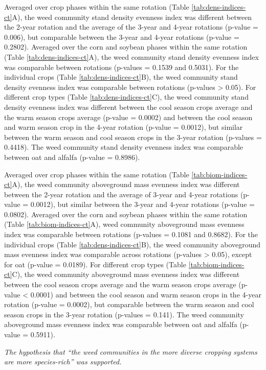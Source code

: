 \documentclass[
]{article}
\begin{document}
Averaged over crop phases within the same rotation (Table \ref{tab:dens-indices-ct}A), the weed community stand density evenness index was different between the 2-year rotation and the average of the 3-year and 4-year rotations (p-value = 0.006), but comparable between the 3-year and 4-year rotations (p-value = 0.2802). Averaged over the corn and soybean phases within the same rotation (Table \ref{tab:dens-indices-ct}A), the weed community stand density evenness index was comparable between rotations (p-values = 0.1539 and 0.5031). For the individual crops (Table \ref{tab:dens-indices-ct}B), the weed community stand density evenness index was comparable between rotations (p-values \textgreater{} 0.05). For different crop types (Table \ref{tab:dens-indices-ct}C), the weed community stand density evenness index was different between the cool season crops average and the warm season crops average (p-value = 0.0002) and between the cool season and warm season crop in the 4-year rotation (p-value = 0.0012), but similar between the warm season and cool season crops in the 3-year rotation (p-values = 0.4418). The weed community stand density evenness index was comparable between oat and alfalfa (p-value = 0.8986).

Averaged over crop phases within the same rotation (Table \ref{tab:biom-indices-ct}A), the weed community aboveground mass evenness index was different between the 2-year rotation and the average of 3-year and 4-year rotations (p-value = 0.0012), but similar between the 3-year and 4-year rotations (p-value = 0.0802). Averaged over the corn and soybean phases within the same rotation (Table \ref{tab:biom-indices-ct}A), weed community aboveground mass evenness index was comparable between rotations (p-values = 0.1081 and 0.8682). For the individual crops (Table \ref{tab:dens-indices-ct}B), the weed community aboveground mass evenness index was comparable across rotations (p-values \textgreater{} 0.05), except for oat (p-value = 0.0189). For different crop types (Table \ref{tab:biom-indices-ct}C), the weed community aboveground mass evenness index was different between the cool season crops average and the warm season crops average (p-value \textless{} 0.0001) and between the cool season and warm season crops in the 4-year rotation (p-value = 0.0002), but comparable between the warm season and cool season crops in the 3-year rotation (p-values = 0.141). The weed community aboveground mass evenness index was comparable between oat and alfalfa (p-value = 0.5911).

\emph{The hypothesis that ``the weed communities in the more diverse cropping systems are more species-rich'' was supported.}
\end{document}
